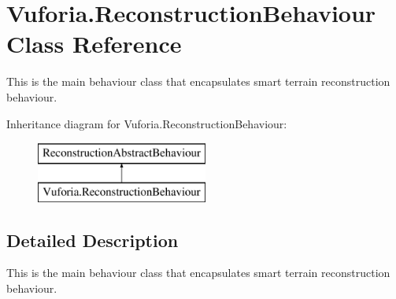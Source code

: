 \hypertarget{class_vuforia_1_1_reconstruction_behaviour}{}\section{Vuforia.\+Reconstruction\+Behaviour Class Reference}
\label{class_vuforia_1_1_reconstruction_behaviour}


This is the main behaviour class that encapsulates smart terrain reconstruction behaviour.  


Inheritance diagram for Vuforia.\+Reconstruction\+Behaviour\+:\begin{figure}[H]
\begin{center}
\leavevmode
\includegraphics[height=2.000000cm]{class_vuforia_1_1_reconstruction_behaviour}
\end{center}
\end{figure}


\subsection{Detailed Description}
This is the main behaviour class that encapsulates smart terrain reconstruction behaviour. 

